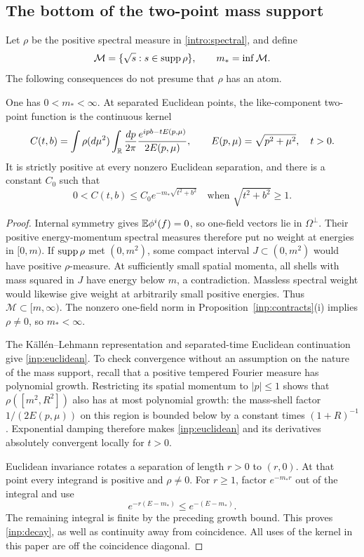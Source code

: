 \subsection{The bottom of the two-point mass support}

Let $\rho$ be the positive spectral measure in
\eqref{intro:spectral}, and define
\[
 \mathcal M=\{\sqrt{s}:s\in\operatorname{supp}\rho\},\qquad m_*=\inf\mathcal M.
\]
The following consequences do not presume that $\rho$ has an atom.

\begin{lemma}
\label{inp:kernel}
One has $0<m_*<\infty$.  At separated Euclidean points, the
like-component two-point function is the continuous kernel
\begin{equation}
 C(t,b)=\int\rho(d\mu^2)\int_{\mathbb R}\frac{dp}{2\pi}
          \frac{e^{ipb-tE(p,\mu)}}{2E(p,\mu)},
 \qquad E(p,\mu)=\sqrt{p^2+\mu^2},\quad t>0.
 \label{inp:euclidean}
\end{equation}
It is strictly positive at every nonzero Euclidean separation, and
there is a constant $C_0$ such that
\begin{equation}
 0<C(t,b)\le C_0e^{-m_*\sqrt{t^2+b^2}}
 \quad\text{when }\sqrt{t^2+b^2}\ge1.
 \label{inp:decay}
\end{equation}
\end{lemma}

\begin{proof}
Internal symmetry gives $\mathbb E\phi^i(f)=0$, so one-field vectors lie in
$\Omega^\perp$.  Their positive energy-momentum spectral measures
therefore put no weight at energies in $[0,m)$.  If $\operatorname{supp}\rho$ met
$(0,m^2)$, some compact interval $J\subset(0,m^2)$ would have positive
$\rho$-measure.  At sufficiently small spatial momenta, all shells
with mass squared in $J$ have energy below $m$, a contradiction.
Massless spectral weight would likewise give weight at arbitrarily
small positive energies.  Thus $\mathcal M\subset[m,\infty)$.
The nonzero one-field norm in Proposition~\ref{inp:contracts}(i)
implies $\rho\ne0$, so $m_*<\infty$.

The K\"all\'en--Lehmann representation
\cite{Kallen1952,Lehmann1954} and separated-time Euclidean continuation
give \eqref{inp:euclidean}.  To check convergence without an assumption
on the nature of the mass support, recall that a positive tempered
Fourier measure has polynomial growth.  Restricting its spatial
momentum to $|p|\le1$ shows that $\rho([m^2,R^2])$ also has at most
polynomial growth: the mass-shell factor $1/(2E(p,\mu))$ on this
region is bounded below by a constant times $(1+R)^{-1}$.
Exponential damping therefore makes \eqref{inp:euclidean} and its
derivatives absolutely convergent locally for $t>0$.

Euclidean invariance rotates a separation of length $r>0$ to $(r,0)$.
At that point every integrand is positive and $\rho\ne0$.
For $r\ge1$, factor $e^{-m_*r}$ out of the integral and use
\[
 e^{-r(E-m_*)}\le e^{-(E-m_*)}.
\]
The remaining integral is finite by the preceding growth bound.
This proves \eqref{inp:decay}, as well as continuity away from
coincidence.  All uses of the kernel in this paper are off the
coincidence diagonal.
\end{proof}

